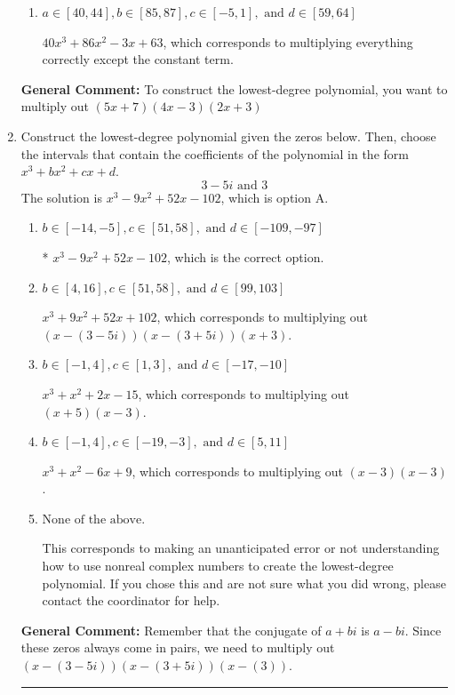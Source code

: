 \documentclass{extbook}[14pt]
\newcommand{\litem}[1]{\item #1

\rule{\textwidth}{0.4pt}}
\begin{document}
\begin{enumerate}
{\begin{enumerate}[label=\Alph*.]
$40x^{3} -26 x^{2} -87 x + 63$, which corresponds to multiplying out $(5x + 5)(4x -4)(2x -2)$.
\item \( a \in [40, 44], b \in [85, 87], c \in [-5, 1], \text{ and } d \in [59, 64] \)

$40x^{3} +86 x^{2} -3 x + 63$, which corresponds to multiplying everything correctly except the constant term.
\end{enumerate}

\textbf{General Comment:} To construct the lowest-degree polynomial, you want to multiply out $(5x + 7)(4x -3)(2x + 3)$
}
\litem{
Construct the lowest-degree polynomial given the zeros below. Then, choose the intervals that contain the coefficients of the polynomial in the form $x^3+bx^2+cx+d$.
\[ 3 - 5 i \text{ and } 3 \]
The solution is \( x^{3} -9 x^{2} +52 x -102 \), which is option A.\begin{enumerate}[label=\Alph*.]
\item \( b \in [-14, -5], c \in [51, 58], \text{ and } d \in [-109, -97] \)

* $x^{3} -9 x^{2} +52 x -102$, which is the correct option.
\item \( b \in [4, 16], c \in [51, 58], \text{ and } d \in [99, 103] \)

$x^{3} +9 x^{2} +52 x + 102$, which corresponds to multiplying out $(x-(3 - 5 i))(x-(3 + 5 i))(x + 3)$.
\item \( b \in [-1, 4], c \in [1, 3], \text{ and } d \in [-17, -10] \)

$x^{3} + x^{2} +2 x -15$, which corresponds to multiplying out $(x + 5)(x -3)$.
\item \( b \in [-1, 4], c \in [-19, -3], \text{ and } d \in [5, 11] \)

$x^{3} + x^{2} -6 x + 9$, which corresponds to multiplying out $(x -3)(x -3)$.
\item \( \text{None of the above.} \)

This corresponds to making an unanticipated error or not understanding how to use nonreal complex numbers to create the lowest-degree polynomial. If you chose this and are not sure what you did wrong, please contact the coordinator for help.
\end{enumerate}

\textbf{General Comment:} Remember that the conjugate of $a+bi$ is $a-bi$. Since these zeros always come in pairs, we need to multiply out $(x-(3 - 5 i))(x-(3 + 5 i))(x-(3))$.
}
\end{enumerate}
\end{document}
